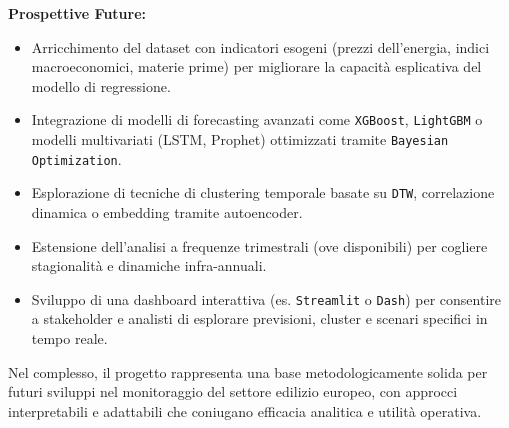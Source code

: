 \documentclass[conference]{IEEEtran}
\begin{document}
\vspace{0.5em}
\noindent\textbf{Prospettive Future:}
\begin{itemize}
  \item Arricchimento del dataset con indicatori esogeni (prezzi dell'energia, indici macroeconomici, materie prime) per migliorare la capacità esplicativa del modello di regressione.
  \item Integrazione di modelli di forecasting avanzati come \texttt{XGBoost}, \texttt{LightGBM} o modelli multivariati (LSTM, Prophet) ottimizzati tramite \texttt{Bayesian Optimization}.
  \item Esplorazione di tecniche di clustering temporale basate su \texttt{DTW}, correlazione dinamica o embedding tramite autoencoder.
  \item Estensione dell’analisi a frequenze trimestrali (ove disponibili) per cogliere stagionalità e dinamiche infra-annuali.
  \item Sviluppo di una dashboard interattiva (es. \texttt{Streamlit} o \texttt{Dash}) per consentire a stakeholder e analisti di esplorare previsioni, cluster e scenari specifici in tempo reale.
\end{itemize}

Nel complesso, il progetto rappresenta una base metodologicamente solida per futuri sviluppi nel monitoraggio del settore edilizio europeo, con approcci interpretabili e adattabili che coniugano efficacia analitica e utilità operativa.
\end{document}
